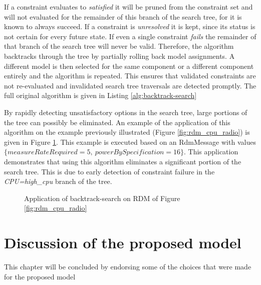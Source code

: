If a constraint evaluates to \emph{satisfied} it will be pruned from the constraint set and will not evaluated for the remainder of this branch of the search tree, for it is known to always succeed. If a constraint is \emph{unresolved} it is kept, since its status is not certain for every future state. If even a single constraint \emph{fails} the remainder of that branch of the search tree will never be valid. Therefore, the algorithm backtracks through the tree by partially rolling back model assignments. A different model is then selected for the same component or a different component entirely and the algorithm is repeated. This ensures that validated constraints are not re-evaluated and invalidated search tree traversals are detected promptly. The full original algorithm is given in Listing \ref{alg:backtrack-search}

By rapidly detecting unsatisfactory options in the search tree, large portions of the tree can possibly be eliminated. An example of the application of this algorithm on the example previously illustrated (Figure \ref{fig:rdm_cpu_radio}) is given in Figure \ref{fig:search_cpu_radio}. This example is executed based on an RdmMessage with values $\{measureRateRequired=5,\ powerBySpecification=16\}$. This application demonstrates that using this algorithm eliminates a significant portion of the search tree. This is due to early detection of constraint failure in the \emph{CPU=high\_cpu} branch of the tree.



\begin{figure}

\caption{Application of backtrack-search on RDM of Figure \ref{fig:rdm_cpu_radio}}
\label{fig:search_cpu_radio}
\end{figure}

\section{Discussion of the proposed model}
This chapter will be concluded by endorsing some of the choices that were made for the proposed model
